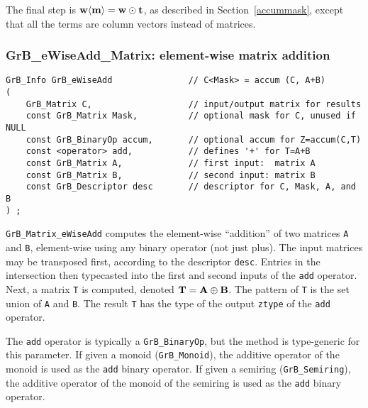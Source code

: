 \documentclass[12pt]{article}
\begin{document}
The final step is ${\bf w \langle m \rangle  = w \odot t}$, as described in
Section~\ref{accummask}, except that all the terms are column vectors instead
of matrices.

\subsubsection{{\sf GrB\_eWiseAdd\_Matrix:} element-wise matrix addition}
\label{eWiseAdd_matrix}

\begin{mdframed}[userdefinedwidth=6in]
{\footnotesize
\begin{verbatim}
GrB_Info GrB_eWiseAdd               // C<Mask> = accum (C, A+B)
(
    GrB_Matrix C,                   // input/output matrix for results
    const GrB_Matrix Mask,          // optional mask for C, unused if NULL
    const GrB_BinaryOp accum,       // optional accum for Z=accum(C,T)
    const <operator> add,           // defines '+' for T=A+B
    const GrB_Matrix A,             // first input:  matrix A
    const GrB_Matrix B,             // second input: matrix B
    const GrB_Descriptor desc       // descriptor for C, Mask, A, and B
) ;
\end{verbatim} } \end{mdframed}

\verb'GrB_Matrix_eWiseAdd' computes the element-wise ``addition'' of two
matrices \verb'A' and \verb'B', element-wise using any binary operator (not
just plus).  The input matrices may be transposed first, according to the
descriptor \verb'desc'.  Entries in the intersection then typecasted into the
first and second inputs of the \verb'add' operator.  Next, a matrix \verb'T' is
computed, denoted ${\bf T = A \oplus B}$.  The pattern of \verb'T' is the set
union of \verb'A' and \verb'B'.  The result \verb'T' has the type of the output
\verb'ztype' of the \verb'add' operator.

The \verb'add' operator is typically a \verb'GrB_BinaryOp', but the method is
type-generic for this parameter.  If given a monoid (\verb'GrB_Monoid'), the
additive operator of the monoid is used as the \verb'add' binary operator.  If
given a semiring (\verb'GrB_Semiring'), the additive operator of the monoid of
the semiring is used as the \verb'add' binary operator.
\end{document}

